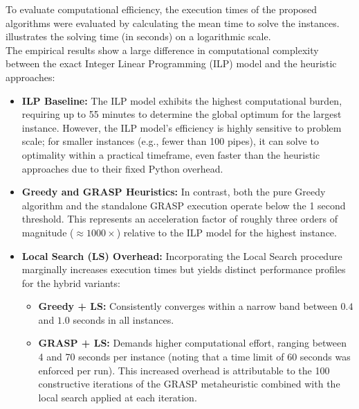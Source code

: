 \documentclass{article}
\begin{document}
To evaluate computational efficiency, the execution times of the proposed algorithms were evaluated by calculating the mean time to solve the instances.  illustrates the solving time (in seconds) on a logarithmic scale.
\\
The empirical results show a large difference in computational complexity between the exact Integer Linear Programming (ILP) model and the heuristic approaches:
\begin{itemize}
    \item \textbf{ILP Baseline:} The ILP model exhibits the highest computational burden, requiring up to 55 minutes to determine the global optimum for the largest instance. However, the ILP model's efficiency is highly sensitive to problem scale; for smaller instances (e.g., fewer than 100 pipes), it can solve to optimality within a practical timeframe, even faster than the heuristic approaches due to their fixed Python overhead.
    \item \textbf{Greedy and GRASP Heuristics:} In contrast, both the pure Greedy algorithm and the standalone GRASP execution operate below the 1 second threshold. This represents an acceleration factor of roughly three orders of magnitude ($\approx 1000\times$) relative to the ILP model for the highest instance.
    \item \textbf{Local Search (LS) Overhead:} Incorporating the Local Search procedure marginally increases execution times but yields distinct performance profiles for the hybrid variants:
    \begin{itemize}
        \item \textbf{Greedy + LS:} Consistently converges within a narrow band between $0.4$ and $1.0$ seconds in all instances.
        \item \textbf{GRASP + LS:} Demands higher computational effort, ranging between 4 and 70 seconds per instance (noting that a time limit of 60 seconds was enforced per run). This increased overhead is attributable to the 100 constructive iterations of the GRASP metaheuristic combined with the local search applied at each iteration.
    \end{itemize}
\end{itemize}

%
\end{document}
